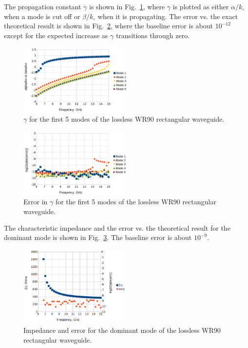 \documentclass[titlepage]{article}
\renewcommand\_{\textunderscore\linebreak[1]}
\begin{document}
The propagation constant $\gamma$ is shown in Fig.~\ref{fig:WR90_gamma}, where $\gamma$ is plotted as either $\alpha/k_{\circ}$ when a mode is cut off or $\beta/k_{\circ}$ when it is propagating.  The error vs. the exact theoretical result is shown in Fig.~\ref{fig:WR90_gamma_error}, where the baseline error is about $10^{-12}$ except for the expected increase as $\gamma$ transitions through zero.

\begin{figure}[H]
  \centering
  \includegraphics[width=0.5\textwidth]{../regression/OpenParEM2D/WR90_rectangular_waveguide/WR90/WR90_order_6_study/screenshots/WR90_gamma}
  \caption{$\gamma$ for the first 5 modes of the lossless WR90 rectangular waveguide.}
  \label{fig:WR90_gamma}
\end{figure}

\begin{figure}[H]
  \centering
  \includegraphics[width=0.5\textwidth]{../regression/OpenParEM2D/WR90_rectangular_waveguide/WR90/WR90_order_6_study/screenshots/WR90_gamma_error}
  \caption{Error in $\gamma$ for the first 5 modes of the lossless WR90 rectangular waveguide.}
  \label{fig:WR90_gamma_error}
\end{figure}

The characteristic impedance and the error vs. the theoretical result for the dominant mode is shown in Fig.~\ref{fig:WR90_impedance}.  The baseline error is about $10^{-9}$.

\begin{figure}[H]
  \centering
  \includegraphics[width=0.5\textwidth]{../regression/OpenParEM2D/WR90_rectangular_waveguide/WR90/WR90_order_6_study/screenshots/WR90_impedance}
  \caption{Impedance and error for the dominant mode of the lossless WR90 rectangular waveguide.}
  \label{fig:WR90_impedance}
\end{figure}
\end{document}

